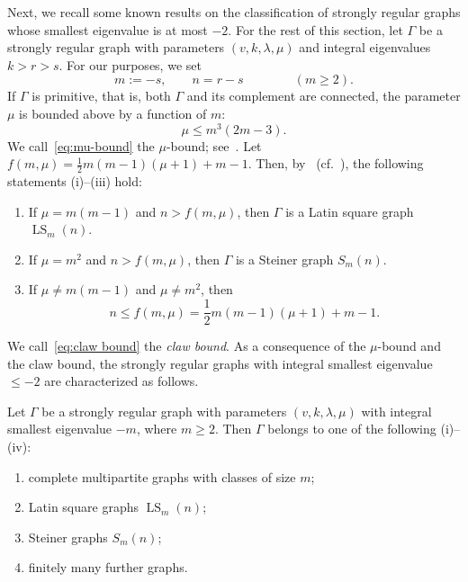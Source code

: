 Next, we recall some known results on the classification of strongly regular graphs whose smallest eigenvalue is at most $-2$.
For the rest of this section, let $\Gamma$ be a strongly regular graph with parameters $(v, k, \lambda, \mu)$ and integral eigenvalues $k > r > s$.
For our purposes, we set 
\begin{equation}\label{Def:m,n}
	m := -s, \qquad n = r - s  \qquad \qquad (m \geqslant 2).
\end{equation}
If $\Gamma$ is primitive, that is, both $\Gamma$ and its complement are connected, the parameter $\mu$ is bounded above by a function of $m$:
\begin{equation}\label{eq:mu-bound}
	\mu \leqslant m^3 (2m -3).
\end{equation}
We call~\eqref{eq:mu-bound} the $\mu$-bound; see~\cite[Theorem 3.1]{Neumaier.1979}.
Let $f(m,\mu) = \frac{1}{2}m(m-1)(\mu+1) +m-1$.
Then, by~\cite[Theorem 4.7]{Neumaier.1979} (cf.~\cite[Theorem 8.6.3]{BrVM2022}), the following statements (i)--(iii) hold:
\begin{enumerate}[\normalfont(i)]
	\item If $\mu=m(m-1)$ and $n > f(m,\mu)$, then $\Gamma$ is a Latin square graph $\operatorname{LS}_m(n)$.
	\item If $\mu=m^2$ and $n > f(m,\mu)$, then $\Gamma$ is a Steiner graph $S_m(n)$.
	\item If $\mu\neq m(m-1)$ and $\mu \neq m^2$, then 
	\begin{equation}\label{eq:claw bound}
	n \leqslant f(m,\mu) = \frac{1}{2}m(m-1)(\mu+1) +m-1.
\end{equation} 
\end{enumerate}
We call~\eqref{eq:claw bound} the \emph{claw bound}.
As a consequence of the $\mu$-bound and the claw bound, the strongly regular graphs with integral smallest eigenvalue $\leqslant -2$ are characterized as follows.


\begin{lemm}\label{SRG of Sims}
Let $\Gamma$ be a strongly regular graph with parameters $(v,k,\lambda, \mu)$ with integral smallest eigenvalue $-m$, where $m\geqslant 2$. 
Then $\Gamma$ belongs to one of the following {\rm(i)}--{\rm(iv)}:
\begin{enumerate}[\normalfont(i)]
  \item complete multipartite graphs with classes of size $m$;
  \item Latin square graphs $\operatorname{LS}_m(n)$;
  \item Steiner graphs $S_m(n)$;
  \item finitely many further graphs.
\end{enumerate}
\end{lemm}

